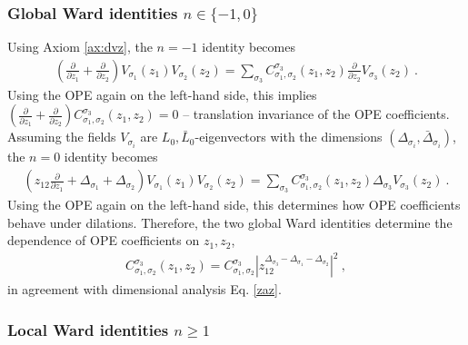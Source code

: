 \documentclass[12pt, a4paper, notitlepage, twoside]{report}
\numberwithin{equation}{section}
\theoremstyle{break}
\begin{document}
\subsubsection{Global Ward identities $n\in\{-1,0\}$}

Using Axiom \ref{ax:dvz}, the $n=-1$ identity becomes 
 \begin{align}
  \left(\frac{\partial}{\partial z_1} +\frac{\partial}{\partial z_2}\right) V_{\sigma_1}(z_1)V_{\sigma_2}(z_2) = \sum_{\sigma_3} C_{\sigma_1,\sigma_2}^{\sigma_3}(z_1,z_2) \frac{\partial}{\partial z_2} V_{\sigma_3}(z_2)\ .
 \end{align}
Using the OPE again on the left-hand side, this implies $\left(\frac{\partial}{\partial z_1} +\frac{\partial}{\partial z_2}\right) C_{\sigma_1,\sigma_2}^{\sigma_3}(z_1,z_2)=0$ -- translation invariance of the OPE coefficients. 
Assuming the fields $V_{\sigma_i}$ are  $L_0,\bar L_0$-eigenvectors with the dimensions $(\Delta_{\sigma_i}, \bar\Delta_{\sigma_i})$, the $n=0$ identity becomes 
\begin{align}
 \left(z_{12}\frac{\partial}{\partial z_1} + \Delta_{\sigma_1}+\Delta_{\sigma_2}\right) V_{\sigma_1}(z_1)V_{\sigma_2}(z_2) = \sum_{\sigma_3} C_{\sigma_1,\sigma_2}^{\sigma_3}(z_1,z_2) \Delta_{\sigma_3} V_{\sigma_3}(z_2)\ .
\end{align}
Using the OPE again on the left-hand side, this
determines how OPE coefficients behave under dilations. 
Therefore, the two global Ward identities determine the dependence of OPE coefficients on $z_1,z_2$,
\begin{align}
 C_{\sigma_1,\sigma_2}^{\sigma_3}(z_1,z_2) = C_{\sigma_1,\sigma_2}^{\sigma_3} 
 \left| z_{12}^{\Delta_{{\sigma_3}}-\Delta_{\sigma_1}-\Delta_{\sigma_2}} \right|^2 
 \ ,
 \label{eq:coz}
\end{align}
in agreement with dimensional analysis Eq. \eqref{zaz}.

\subsubsection{Local Ward identities $n\geq 1$}
\end{document}
